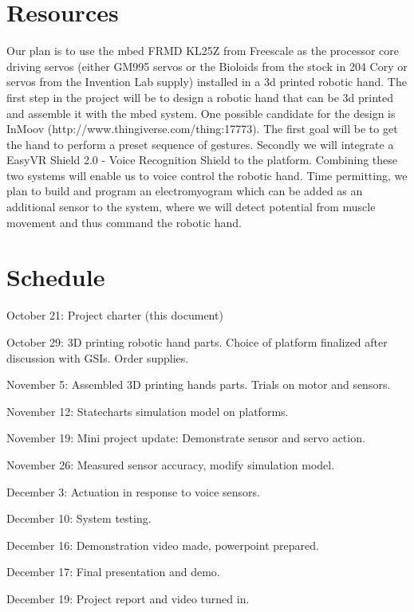 \documentclass[twoside]{article}
\begin{document}
\section{Resources}
Our plan is to use the mbed FRMD KL25Z from Freescale as the processor core driving servos (either GM995 servos or the Bioloids from the stock in 204 Cory or servos from the Invention Lab supply) installed in a 3d printed robotic hand. The first step in the project will be to design a robotic hand that can be 3d printed and assemble it with the mbed system. One possible candidate for the design is InMoov (http://www.thingiverse.com/thing:17773). The first goal will be to get the hand to perform a preset sequence of gestures. Secondly we will integrate a EasyVR Shield 2.0 - Voice Recognition Shield to the platform. Combining these two systems will enable us to voice control the robotic hand. Time permitting, we plan to build and program an electromyogram which can be added as an additional sensor to the system, where we will detect potential from muscle movement and thus command the robotic hand.

\section*{Schedule}
\begin{compactitem}
\item	October 21: Project charter (this document)
\item	October 29: 3D printing robotic hand parts. Choice of platform finalized after discussion with GSIs. Order supplies.
\item	November 5: Assembled 3D printing hands parts. Trials on motor and sensors.
\item	November 12: Statecharts simulation model on platforms.
\item	November 19: Mini project update: Demonstrate sensor and servo action.
\item	November 26: Measured sensor accuracy, modify simulation model.
\item	December 3: Actuation in response to voice sensors.
\item	December 10: System testing.
\item	December 16: Demonstration video made, powerpoint prepared.
\item	December 17: Final presentation and demo.
\item	December 19: Project report and video turned in. 
\end{compactitem}
\end{document}
